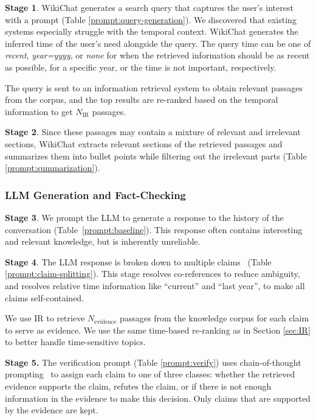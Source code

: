 \documentclass[11pt]{article}
\newcommand{\system}[0]{WikiChat\xspace}
\begin{document}
{\bf Stage 1}. \system generates a search query that captures the user's interest with a prompt (Table \ref{prompt:query-generation}).
We discovered that existing systems especially struggle with the temporal context. \system generates the inferred time of the user's need alongside the query. The query time can be one of \emph{recent}, \emph{year=yyyy}, or \emph{none} for when the retrieved information should be as recent as possible, for a specific year, or the time is not important, respectively. 

The query is sent to an information retrieval system to obtain relevant passages from the corpus, and the top results are re-ranked based on the temporal information to get
$N_{\text{IR}}$ passages. 

{\bf Stage 2}.
Since these passages may contain a mixture of relevant and irrelevant sections, \system extracts relevant sections of the retrieved passages and summarizes them into bullet points while filtering out the irrelevant parts (Table \ref{prompt:summarization}).

\subsubsection{LLM Generation and Fact-Checking}
\label{sec:fact-checking}
{\bf Stage 3}. We prompt the LLM to generate a response to the history of the conversation (Table~\ref{prompt:baseline}). This response often contains interesting and relevant knowledge, but is inherently unreliable.

{\bf Stage 4}. The LLM response is broken down to multiple claims~\cite{chen-etal-2022-generating} (Table \ref{prompt:claim-splitting}). 
This stage resolves co-references to reduce ambiguity, and resolves relative time information like ``current'' and ``last year'', to make all claims self-contained.

We use IR to retrieve $N_{\text{evidence}}$ passages from the knowledge corpus for each claim to serve as evidence. We use the same time-based re-ranking as in Section \ref{sec:IR} to better handle time-sensitive topics. 

{\bf Stage 5.} The verification prompt (Table \ref{prompt:verify}) uses chain-of-thought prompting~\cite{chain-of-thought} to assign each claim to one of three classes: whether the retrieved evidence supports the claim, refutes the claim, or if there is not enough information in the evidence to make this decision. Only claims that are supported by the evidence are kept.
\end{document}
